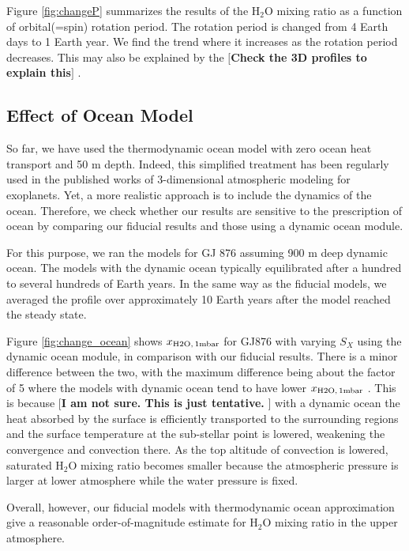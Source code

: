 \documentclass[11pt,numberedappendix,twocolappendix,]{emulateapj}
\def\water{H$_2$O }
\def\xwater{$x_{\rm H2O,\,1mbar}$ }
\def\memo#1{\color{red}$[${\bf #1}$]$ \color{black}}
\begin{document}
Figure \ref{fig:changeP} summarizes the results of the \water mixing ratio as a function of orbital(=spin) rotation period. 
The rotation period is changed from 4 Earth days to 1 Earth year. 
We find the trend where it increases as the rotation period decreases. 
This may also be explained by the 
\memo{Check the 3D profiles to explain this}. 



\subsection{Effect of Ocean Model}
\label{ss:sensitivity_ocean}


So far, we have used the thermodynamic ocean model with zero ocean heat transport and 50 m depth. 
Indeed, this simplified treatment has been regularly used in the published works of 3-dimensional atmospheric modeling for exoplanets. 
Yet, a more realistic approach is to include the dynamics of the ocean. 
Therefore, we check whether our results are sensitive to the prescription of ocean by comparing our fiducial results and those using a dynamic ocean module. 

For this purpose, we ran the models for GJ 876 assuming 900 m deep dynamic ocean. 
The models with the dynamic ocean typically equilibrated after a hundred to several hundreds of Earth years. 
In the same way as the fiducial models, we averaged the profile over approximately 10 Earth years after the model reached the steady state. 

Figure \ref{fig:change_ocean} shows \xwater for GJ876 with varying $S_X$ using the dynamic ocean module, in comparison with our fiducial results.  
There is a minor difference between the two, with the maximum difference being about the factor of 5 where the models with dynamic ocean tend to have lower \xwater. 
This is because \memo{I am not sure. This is just tentative. } with a dynamic ocean the heat absorbed by the surface is efficiently transported to the surrounding regions and the surface temperature at the sub-stellar point is lowered, weakening the convergence and convection there.
As the top altitude of convection is lowered, saturated \water mixing ratio becomes smaller because the atmospheric pressure is larger at lower atmosphere while the water pressure is fixed. 

Overall, however, our fiducial models with thermodynamic ocean approximation give a reasonable order-of-magnitude estimate for \water mixing ratio in the upper atmosphere. 
\end{document}
